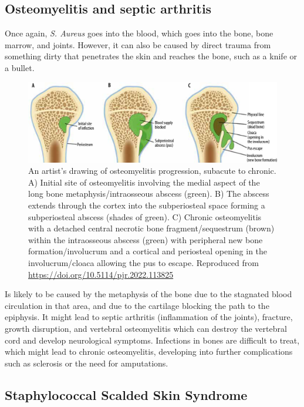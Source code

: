 \subsection{Osteomyelitis and septic arthritis}

Once again, \textit{S. Aureus} goes into the blood, which goes into the bone, bone marrow, and joints. However, it can also be caused by direct trauma from something dirty that penetrates the skin and reaches the bone, such as a knife or a bullet.

    \begin{figure}[h]
        \centering
            \includegraphics[width=0.7\linewidth]{figures/Staph/PJR-87-46472-g022.jpg} 
        \caption{An artist’s drawing of osteomyelitis progression, subacute to chronic. A) Initial site of osteomyelitis involving the medial aspect of the long bone metaphysis/intraosseous abscess (green). B) The abscess extends through the cortex into the subperiosteal space forming a subperiosteal abscess (shades of green). C) Chronic osteomyelitis with a detached central necrotic bone fragment/sequestrum (brown) within the intraosseous abscess (green) with peripheral new bone formation/involucrum and a cortical and periosteal opening in the involucrum/cloaca allowing the pus to escape. Reproduced from \url{ https://doi.org/10.5114/pjr.2022.113825}}
        \label{figure:osteomyelitis}
    \end{figure}

Is likely to be caused by the metaphysis of the bone due to the stagnated blood circulation in that area, and due to the cartilage blocking the path to the epiphysis. It might lead to septic arthritis (inflammation of the joints), fracture, growth disruption, and vertebral osteomyelitis which can destroy the vertebral cord and develop neurological symptoms. Infections in bones are difficult to treat, which might lead to chronic osteomyelitis, developing into further complications such as sclerosis or the need for amputations.


\subsection{Staphylococcal Scalded Skin Syndrome}


